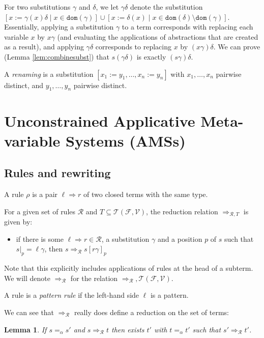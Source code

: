 \documentclass{lmcs}
\theoremstyle{theorem}\newtheorem{theorem}{Theorem}
\theoremstyle{theorem}\newtheorem{lemma}[theorem]{Lemma}
\theoremstyle{theorem}\newtheorem{corollary}[theorem]{Corollary}
\theoremstyle{definition}\newtheorem{definition}[theorem]{Definition}
\theoremstyle{definition}\newtheorem{example}[theorem]{Example}
\newcommand{\F}{\mathcal{F}}
\newcommand{\V}{\mathcal{V}}
\newcommand{\Terms}{\mathcal{T}}
\newcommand{\Rules}{\mathcal{R}}
\newcommand{\domain}{\mathtt{dom}}
\newcommand{\avar}{x}
\newcommand{\arrz}{\Rightarrow}
\newcommand{\arr}[1]{\arrz_{#1}}
\begin{document}
For two substitutions $\gamma$ and $\delta$, we let $\gamma\delta$ denote the substitution
$[\avar := \gamma(\avar)\delta \mid \avar \in \domain(\gamma)] \cup
[\avar := \delta(\avar) \mid \avar \in \domain(\delta) \setminus \domain(\gamma)]$.
Essentially, applying a substitution $\gamma$ to a term corresponds with replacing each variable
$\avar$ by $\avar\gamma$ (and evaluating the applications of abstractions that are created as a
result), and applying $\gamma\delta$ corresponds to replacing $\avar$ by $(\avar\gamma)\delta$.
We can prove (Lemma \ref{lem:combinesubst}) that $s(\gamma\delta)$ is exactly $(s\gamma)\delta$.

A \emph{renaming} is a substitution $[x_1:=y_1,\dots,x_n:=y_n]$ with $x_1,\dots,x_n$ pairwise
distinct, and $y_1,\dots,y_n$ pairwise distinct.


\section{Unconstrained Applicative Meta-variable Systems (AMSs)}

\subsection{Rules and rewriting}

A rule $\rho$ is a pair $\ell \arrz r$ of two closed terms with the same type.

For a given set of rules $\Rules$ and $T \subseteq \Terms(\F,\V)$, the reduction relation
$\arr{\Rules,T}$ is given by:
\begin{itemize}
\item if there is some $\ell \arrz r \in \Rules$, a substitution $\gamma$ and a position $p$ of
  $s$ such that $s|_p = \ell\gamma$, then $s \arr{\Rules} s[r\gamma]_p$
\end{itemize}

\medskip
Note that this explicitly includes applications of rules at the head of a subterm.
We will denote $\arr{\Rules}$ for the relation $\arr{\Rules},\Terms(\F,\V)$.

A rule is a \emph{pattern rule} if the left-hand side $\ell$ is a pattern.

We can see that $\arr{\Rules}$ really does define a reduction on the set of terms:

\begin{lemma}
If $s =_\alpha s'$ and $s \arr{\Rules} t$ then exists $t'$ with $t =_\alpha t'$ such that
$s' \arr{\Rules} t'$.
\end{lemma}
\end{document}
